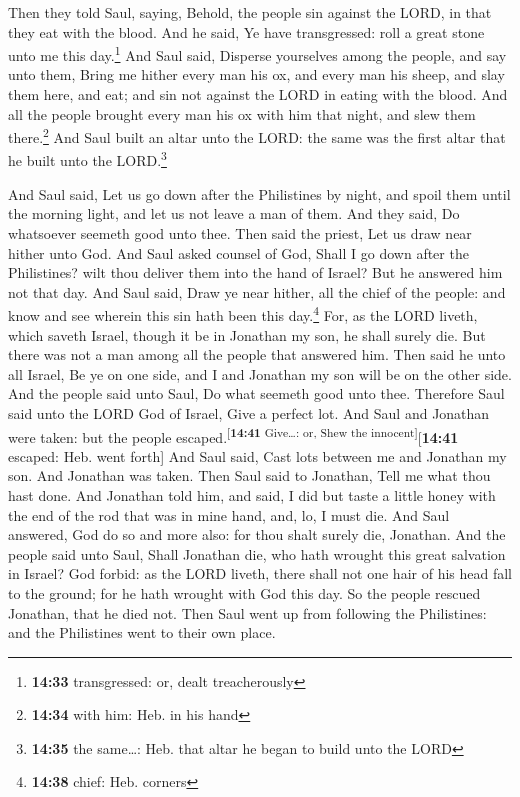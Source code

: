  Then they told Saul, saying, Behold, the people sin
against the LORD, in that they eat with the blood. And he said, Ye have
transgressed: roll a great stone unto me this day.\footnote{\textbf{14:33}
  transgressed: or, dealt treacherously}  And Saul said,
Disperse yourselves among the people, and say unto them, Bring me hither
every man his ox, and every man his sheep, and slay them here, and eat;
and sin not against the LORD in eating with the blood. And all the
people brought every man his ox with him that night, and slew them
there.\footnote{\textbf{14:34} with him: Heb. in his hand}
 And Saul built an altar unto the LORD: the same was the
first altar that he built unto the LORD.\footnote{\textbf{14:35} the
  same\ldots: Heb. that altar he began to build unto the LORD}

 And Saul said, Let us go down after the Philistines by
night, and spoil them until the morning light, and let us not leave a
man of them. And they said, Do whatsoever seemeth good unto thee. Then
said the priest, Let us draw near hither unto God.  And
Saul asked counsel of God, Shall I go down after the Philistines? wilt
thou deliver them into the hand of Israel? But he answered him not that
day.  And Saul said, Draw ye near hither, all the chief
of the people: and know and see wherein this sin hath been this
day.\footnote{\textbf{14:38} chief: Heb. corners}  For,
as the LORD liveth, which saveth Israel, though it be in Jonathan my
son, he shall surely die. But there was not a man among all the people
that answered him.  Then said he unto all Israel, Be ye
on one side, and I and Jonathan my son will be on the other side. And
the people said unto Saul, Do what seemeth good unto thee.
 Therefore Saul said unto the LORD God of Israel, Give a
perfect lot. And Saul and Jonathan were taken: but the people
escaped.\textsuperscript{{[}\textbf{14:41} Give\ldots: or, Shew the
innocent{]}}{[}\textbf{14:41} escaped: Heb. went forth{]}
 And Saul said, Cast lots between me and Jonathan my son.
And Jonathan was taken.  Then Saul said to Jonathan, Tell
me what thou hast done. And Jonathan told him, and said, I did but taste
a little honey with the end of the rod that was in mine hand, and, lo, I
must die.  And Saul answered, God do so and more also:
for thou shalt surely die, Jonathan.  And the people said
unto Saul, Shall Jonathan die, who hath wrought this great salvation in
Israel? God forbid: as the LORD liveth, there shall not one hair of his
head fall to the ground; for he hath wrought with God this day. So the
people rescued Jonathan, that he died not.  Then Saul
went up from following the Philistines: and the Philistines went to
their own place.

